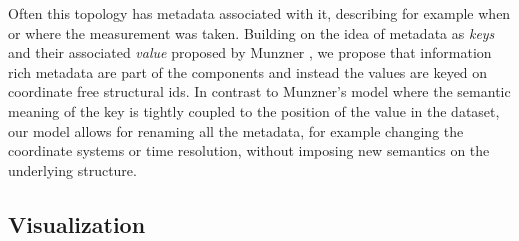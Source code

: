 \documentclass[../main.tex]{subfiles}
\begin{document}
Often this topology has metadata associated with it, describing for example when or where the measurement was taken. Building on the idea of metadata as \textit{keys} and their associated \textit{value} proposed by Munzner \cite{munznerChDataAbstraction}, we propose that information rich metadata are part of the components and instead the values are keyed on coordinate free structural ids. In contrast to Munzner's model where the semantic meaning of the key is tightly coupled to the position of the value in the dataset, our model allows for renaming all the metadata, for example changing the coordinate systems or time resolution, without imposing new semantics on the underlying structure.

\subsection{Visualization}
\end{document}
